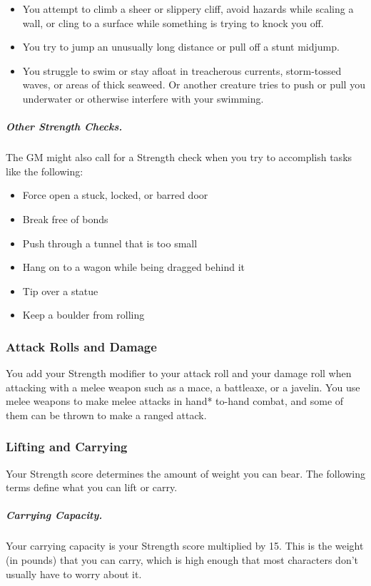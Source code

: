 \begin{itemize}
\item You attempt to climb a sheer or slippery cliff, avoid hazards while scaling a wall, or cling to a surface while something is trying to knock you off.
\item You try to jump an unusually long distance or pull off a stunt midjump.
\item You struggle to swim or stay afloat in treacherous currents, storm-tossed waves, or areas of thick seaweed. Or another creature tries to push or pull you underwater or otherwise interfere with your swimming.
\end{itemize}

\subparagraph*{Other Strength Checks.} The GM might also call for a Strength check when you try to accomplish tasks like the following:

\begin{itemize}
\item Force open a stuck, locked, or barred door
\item Break free of bonds
\item Push through a tunnel that is too small
\item Hang on to a wagon while being dragged behind it
\item Tip over a statue
\item Keep a boulder from rolling
\end{itemize}

\subsubsection{Attack Rolls and Damage}

You add your Strength modifier to your attack roll and your damage roll when attacking with a melee weapon such as a mace, a battleaxe, or a javelin. You use melee weapons to make melee attacks in hand* to-hand combat, and some of them can be thrown to make a ranged attack.

\subsubsection{Lifting and Carrying}

Your Strength score determines the amount of weight you can bear. The following terms define what you can lift or carry.

\subparagraph*{Carrying Capacity.} Your carrying capacity is your Strength score multiplied by 15. This is the weight (in pounds) that you can carry, which is high enough that most characters don't usually have to worry about it.

